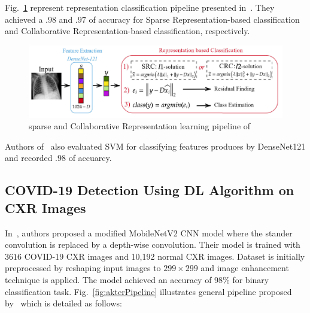 Fig.~\ref{fig:RC} represent representation classification pipeline presented in~\cite{ar}. They achieved a $.98$ and $.97$ of accuracy for Sparse Representation-based classification and Collaborative Representation-based classification, respectively. 
\begin{figure}
    \centering
    \includegraphics[width=\textwidth]{Figures/RCpipline.png}
    \caption{\label{fig:RC} sparse and Collaborative Representation learning pipeline of~\cite{ar}}
\end{figure}
Authors of~\cite{ar} also evaluated SVM for classifying features produces by DenseNet121 and recorded $.98$ of accuarcy.

  
\subsection{COVID-19 Detection Using DL Algorithm on CXR Images}

In~\cite{akt}, authors proposed a modified MobileNetV2 CNN model where the stander convolution is replaced by a depth-wise convolution. Their model is trained with $3616$ COVID-19 CXR images and 10,192 normal CXR images. Dataset is initially preprocessed by reshaping input images to $299\times299$ and image enhancement technique is applied. The model achieved an accuracy of 98\% for binary classification task. Fig.~\ref{fig:akterPipeline} illustrates general pipeline proposed by~\cite{akt} which is detailed as follows:

